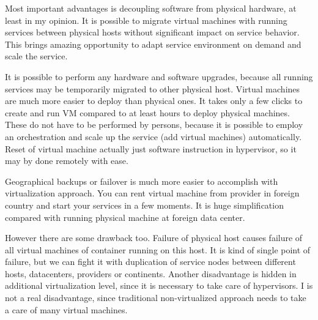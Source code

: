 
Most important advantages is decoupling software from physical hardware, at least in my opinion. It is possible to migrate virtual machines with running services between physical hosts without significant impact on service behavior. This brings amazing opportunity to adapt service environment on demand and scale the service.

It is possible to perform any hardware and software upgrades, because all running services may be temporarily migrated to other physical host. Virtual machines are much more easier to deploy than physical ones. It takes only a few clicks to create and run \Ac{VM} compared to at least hours to deploy physical machines. These  do not have to be performed by persons, because it is possible to employ an orchestration and scale up the service (add virtual machines) automatically.
Reset of virtual machine actually just software instruction in hypervisor, so it may by done remotely with ease.

Geographical backups or failover is much more easier to accomplish with virtualization approach. You can rent virtual machine from provider in foreign country and start your services in a few moments. It is huge simplification compared with running physical machine at foreign data center.



However there are some drawback too. Failure of physical host causes failure of all virtual machines of container running on this host. It is kind of single point of failure, but we can fight it with duplication of service nodes between different hosts, datacenters, providers or continents.
Another disadvantage is hidden in additional virtualization level, since it is necessary to take care of hypervisors. I is not a real disadvantage, since traditional non-virtualized approach needs to take a care of many virtual machines.


